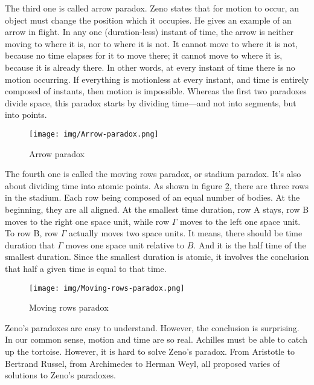 \documentclass{article}
\begin{document}
The third one is called arrow paradox. Zeno states that for motion to occur, an object must change the position which it occupies. He gives an example of an arrow in flight. In any one (duration-less) instant of time, the arrow is neither moving to where it is, nor to where it is not. It cannot move to where it is not, because no time elapses for it to move there; it cannot move to where it is, because it is already there. In other words, at every instant of time there is no motion occurring. If everything is motionless at every instant, and time is entirely composed of instants, then motion is impossible. Whereas the first two paradoxes divide space, this paradox starts by dividing time—and not into segments, but into points.

\begin{figure}[htbp]
 \centering
 \texttt{[image: img/Arrow-paradox.png]}
 \caption{Arrow paradox}
 \label{fig:Arrow-paradox}
\end{figure}

The fourth one is called the moving rows paradox, or stadium paradox. It's also about dividing time into atomic points. As shown in figure \ref{fig:Moving-rows-paradox}, there are three rows in the stadium. Each row being composed of an equal number of bodies. At the beginning, they are all aligned. At the smallest time duration, row A stays, row B moves to the right one space unit, while row $\Gamma$ moves to the left one space unit. To row B, row $\Gamma$ actually moves two space units. It means, there should be time duration that $\Gamma$ moves one space unit relative to $B$. And it is the half time of the smallest duration. Since the smallest duration is atomic, it involves the conclusion that half a given time is equal to that time.

\begin{figure}[htbp]
 \centering
 \texttt{[image: img/Moving-rows-paradox.png]}
 \caption{Moving rows paradox}
 \label{fig:Moving-rows-paradox}
\end{figure}

Zeno's paradoxes are easy to understand. However, the conclusion is surprising. In our common sense, motion and time are so real. Achilles must be able to catch up the tortoise. However, it is hard to solve Zeno's paradox. From Aristotle to Bertrand Russel, from Archimedes to Herman Weyl, all proposed varies of solutions to Zeno's paradoxes\cite{Wikipedia-Zeno}.
\end{document}
